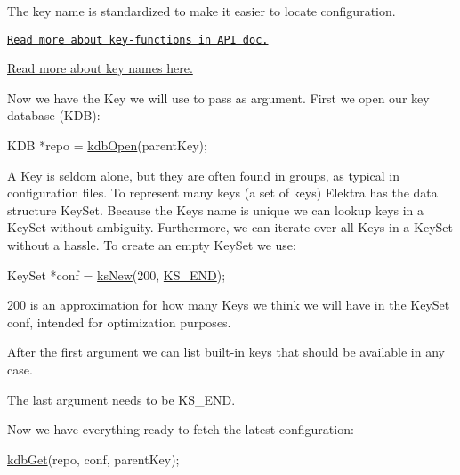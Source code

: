 The key name is standardized to make it easier to locate configuration.


\begin{DoxyItemize}
\item \href{https://doc.libelektra.org/api/current/html/group__key.html}{\tt Read more about key-\/functions in A\+PI doc.}
\item \hyperlink{doc_help_elektra-key-names_md}{Read more about key names here.}
\end{DoxyItemize}

Now we have the {\ttfamily Key} we will use to pass as argument. First we open our key database (K\+DB)\+:


\begin{DoxyCode}
KDB *repo = \hyperlink{group__kdb_ga6808defe5870f328dd17910aacbdc6ca}{kdbOpen}(parentKey);
\end{DoxyCode}


A {\ttfamily Key} is seldom alone, but they are often found in groups, as typical in configuration files. To represent many keys (a set of keys) Elektra has the data structure {\ttfamily Key\+Set}. Because the {\ttfamily Key}\textquotesingle{}s name is unique we can lookup keys in a {\ttfamily Key\+Set} without ambiguity. Furthermore, we can iterate over all {\ttfamily Key}s in a {\ttfamily Key\+Set} without a hassle. To create an empty {\ttfamily Key\+Set} we use\+:


\begin{DoxyCode}
KeySet *conf = \hyperlink{group__keyset_ga671e1aaee3ae9dc13b4834a4ddbd2c3c}{ksNew}(200, \hyperlink{kdbenum_8c_a7a28fce3773b2c873c94ac80b8b4cd54}{KS\_END});
\end{DoxyCode}



\begin{DoxyItemize}
\item 200 is an approximation for how many {\ttfamily Key}s we think we will have in the {\ttfamily Key\+Set} {\ttfamily conf}, intended for optimization purposes.
\item After the first argument we can list built-\/in keys that should be available in any case.
\item The last argument needs to be {\ttfamily K\+S\+\_\+\+E\+ND}.
\end{DoxyItemize}

Now we have everything ready to fetch the latest configuration\+:


\begin{DoxyCode}
\hyperlink{group__kdb_ga28e385fd9cb7ccfe0b2f1ed2f62453a1}{kdbGet}(repo, conf, parentKey);
\end{DoxyCode}


